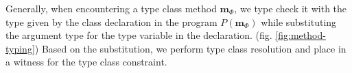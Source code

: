 Generally, when encountering a type class method $\mathbf{m}_\Phi$, we type check it with the type given by the class declaration in the program $P(\mathbf{m}_\Phi)$ while substituting the argument type for the type variable in the declaration. (fig. \ref{fig:method-typing})
Based on the substitution, we perform type class resolution and place in a witness for the type class constraint.









